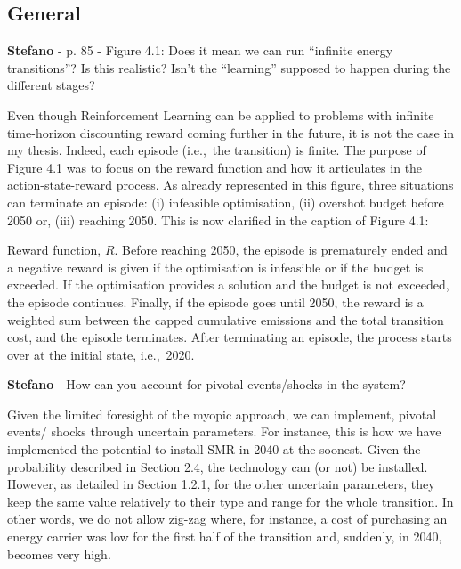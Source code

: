 \documentclass[12pt,a4paper]{article}
\def\ie{i.e.,\ }
\begin{document}
\subsection{General}

\begin{mdframed}[style=comment] %
{\color{orange} \textbf{Stefano}} - p. 85 - Figure 4.1: Does it mean we can run ``infinite energy transitions''? Is this realistic? Isn’t the ``learning'' supposed to happen during the different stages?
\end{mdframed}

\noindent Even though Reinforcement Learning can be applied to problems with infinite time-horizon discounting reward coming further in the future, it is not the case in my thesis. Indeed, each episode (\ie the transition) is finite. The purpose of Figure 4.1 was to focus on the reward function and how it articulates in the action-state-reward process. As already represented in this figure, three situations can terminate an episode: (i) infeasible optimisation, (ii) overshot  budget before 2050 or, (iii) reaching 2050. This is now clarified {\color{blue}in the caption of Figure 4.1}:

\begin{mdframed}[style=manuscript] %
Reward function, $R$. Before reaching 2050, the episode is prematurely ended and a negative reward is given if the optimisation is infeasible or if the  budget is exceeded. If the optimisation provides a solution and the  budget is not exceeded, the episode continues. Finally, if the episode goes until 2050, the reward is a weighted sum between the capped cumulative emissions and the total transition cost, and the episode terminates. After terminating an episode, the process starts over at the initial state, \ie 2020.
\end{mdframed}

\begin{mdframed}[style=comment] %
{\color{orange} \textbf{Stefano}} - How can you account for pivotal events/shocks in the system?
\end{mdframed}

\noindent Given the limited foresight of the myopic approach, we can implement, pivotal events/ shocks through uncertain parameters. For instance, this is how we have implemented the potential to install SMR in 2040 at the soonest. Given the probability described in Section 2.4, the technology can (or not) be installed. However, as detailed in Section 1.2.1, for the other uncertain parameters, they keep the same value relatively to their type and range for the whole transition. In other words, we do not allow zig-zag where, for instance, a cost of purchasing an energy carrier was low for the first half of the transition and, suddenly, in 2040, becomes very high.
\end{document}

